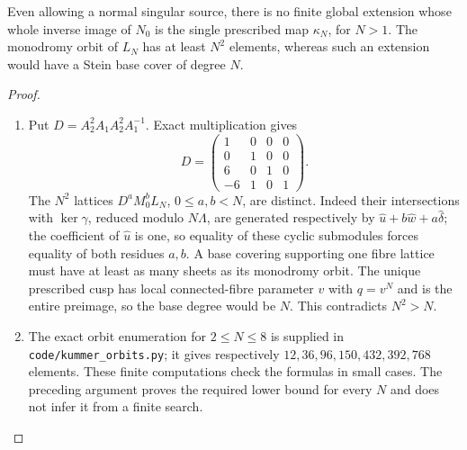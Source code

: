 \begin{proposition}\label{maps:src:C.1.4}


Even allowing a normal singular source, there is no finite global
extension whose whole inverse image of $N_0$ is the single prescribed
map $\kappa_N$, for $N>1$. The monodromy orbit of $L_N$ has at least
$N^2$ elements, whereas such an extension would have a Stein base cover
of degree $N$.

\end{proposition}


\begin{proof}
\begin{enumerate}[label=\arabic*.,leftmargin=*]
\item Put $D=A_2^2A_1A_2^2A_1^{-1}$. Exact multiplication gives
\[
 D=\begin{pmatrix}1&0&0&0\\0&1&0&0\\6&0&1&0\\-6&1&0&1\end{pmatrix}.
\]
The $N^2$ lattices $D^aM_0^bL_N$, $0\leq a,b<N$, are distinct.
Indeed their intersections with $\ker\gamma$, reduced modulo $N\Lambda$,
are generated respectively by
$\widehat u+b\widehat w+a\widehat\delta$; the coefficient of
$\widehat u$ is one, so equality of these cyclic submodules forces
equality of both residues $a,b$. A base covering supporting one fibre
lattice must have at least as many sheets as its monodromy orbit.
The unique prescribed cusp has local connected-fibre parameter $v$
with $q=v^N$ and is the entire preimage, so the base degree would be
$N$. This contradicts $N^2>N$.

\item The exact orbit enumeration for $2\leq N\leq8$ is supplied in
\texttt{code/kummer\_orbits.py}; it gives respectively
$12,36,96,150,432,392,768$ elements. These finite computations check the
formulas in small cases. The preceding argument proves the required
lower bound for every $N$ and does not infer it from a finite search.
\end{enumerate}
\end{proof}

